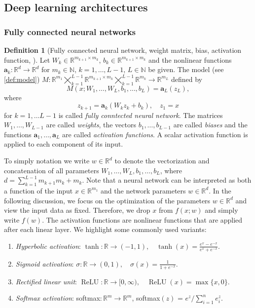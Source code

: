 \documentclass[12pt]{article}
\theoremstyle{definition}
\newtheorem{definition}[definition]{Definition}
\numberwithin{equation}{section}
\newcommand{\N}{\mathbb{N}}
\newcommand{\R}{\mathbb{R}}
\DeclareMathOperator{\ReLU}{ReLU}
\begin{document}
\subsection{Deep learning architectures}
\label{subsec:deep_learning_architectures}
\subsubsection{Fully connected neural networks}
\begin{definition}[Fully connected neural network, weight matrix, bias, activation function, ]
  Let $W_k \in \R^{m_{k+1} \times m_k}$, $b_k \in \R^{m_{k+1} \times m_k}$ and the nonlinear functions $\mathbf{a}_k : \R^d \rightarrow \R^d$ for $m_k \in \N$, $k = 1, \dots, L-1$, $L \in \N$ be given. The model (see \autoref{def:model}) $M : \R^{m_1} \bigtimes_{k=1}^{L-1} \R^{m_{k+1}\times m_{k}}\bigtimes_{k=1}^{L-1} \R^{m_{k}}\rightarrow \R^{m_L}$ defined by
  \begin{equation*}
      M(x;W_1,\dots,W_L,b_1,\dots,b_L) = \mathbf{a}_L(z_L),
  \end{equation*}
  where 
  \begin{equation*}
    \label{eq:nn}
    z_{k+1} = \mathbf{a}_k(W_k z_k + b_k), \quad z_1 = x
  \end{equation*}
  for $k = 1, \dots L-1$ is called \emph{fully conntected neural network}. The matrices $W_1, \dots, W_{L-1}$ are called \emph{weights}, the vectors $b_1, \dots, b_{L-1}$ are called \emph{biases} and the functions $\mathbf{a}_1, \dots, \mathbf{a}_L$ are called \emph{activation functions}. A scalar activation function is applied to each component of its input.
\end{definition}
To simply notation we write $w \in \R^d$ to denote the vectorization and concatenation of all parameters $W_1, \dots, W_L, b_1, \dots, b_L$, where $d = \sum_{k=1}^{L-1} m_{k+1}m_k + m_k$.
Note that a neural network can be interpreted as both a function of the input $x \in \R^{m_1}$ and the network parameters $w \in \R^d$. In the following discussion, we focus on the optimization of the parameters $w \in \R^d$ and view the input data as fixed. Therefore, we drop $x$ from $f(x;w)$ and simply write $f(w)$.
The activation functions are nonlinear functions that are applied after each linear layer. We highlight some commonly used variants:
\begin{enumerate}
  \item \emph{Hyperbolic activation}: $\tanh : \R \rightarrow (-1,1), \quad \tanh(x) = \frac{e^x - e^{-x}}{e^x + e^{-x}}$.
  \item \emph{Sigmoid activation}: $\sigma : \R \rightarrow (0,1), \quad \sigma(x) = \frac{1}{1+e^{-x}}$.
  \item \emph{Rectified linear unit}: $\ReLU : \R \rightarrow [0,\infty), \quad \ReLU(x) = \max\{x,0\}$.
  \item \emph{Softmax activation}: softmax$:\R^m \rightarrow \R^m$, softmax$(z)$ = $e^z / \sum_{i=1}^n e^z_i$.
\end{enumerate}
\end{document}
